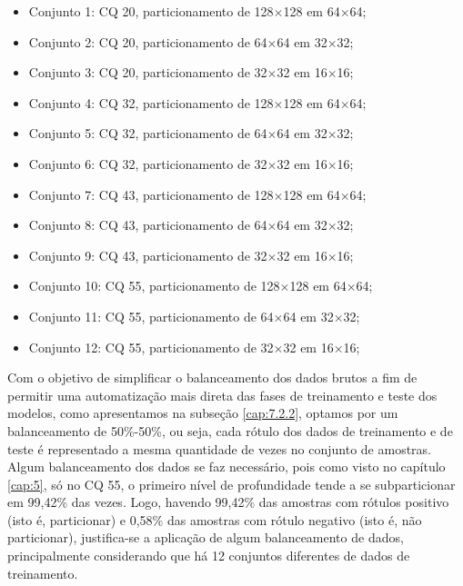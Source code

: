 \begin{itemize}
    \item Conjunto 1: CQ 20, particionamento de 128$\times$128 em 64$\times$64;

    \item Conjunto 2: CQ 20, particionamento de 64$\times$64 em 32$\times$32;

    \item Conjunto 3: CQ 20, particionamento de 32$\times$32 em 16$\times$16;

    \item Conjunto 4: CQ 32, particionamento de 128$\times$128 em 64$\times$64;

    \item Conjunto 5: CQ 32, particionamento de 64$\times$64 em 32$\times$32;

    \item Conjunto 6: CQ 32, particionamento de 32$\times$32 em 16$\times$16;

    \item Conjunto 7: CQ 43, particionamento de 128$\times$128 em 64$\times$64;

    \item Conjunto 8: CQ 43, particionamento de 64$\times$64 em 32$\times$32;

    \item Conjunto 9: CQ 43, particionamento de 32$\times$32 em 16$\times$16;

    \item Conjunto 10: CQ 55, particionamento de 128$\times$128 em 64$\times$64;

    \item Conjunto 11: CQ 55, particionamento de 64$\times$64 em 32$\times$32;

    \item Conjunto 12: CQ 55, particionamento de 32$\times$32 em 16$\times$16;
\end{itemize}

Com o objetivo de simplificar o balanceamento dos dados brutos a fim de permitir uma automatização mais direta das fases de treinamento e teste dos modelos, como apresentamos na subseção \ref{cap:7.2.2}, optamos por um balanceamento de 50\%-50\%, ou seja, cada rótulo dos dados de treinamento e de teste é representado a mesma quantidade de vezes no conjunto de amostras. Algum balanceamento dos dados se faz necessário, pois como visto no capítulo \ref{cap:5}, só no CQ 55, o primeiro nível de profundidade tende a se subparticionar em 99,42\% das vezes. Logo, havendo 99,42\% das amostras com rótulos positivo (isto é, particionar) e 0,58\% das amostras com rótulo negativo (isto é, não particionar), justifica-se a aplicação de algum balanceamento de dados, principalmente considerando que há 12 conjuntos diferentes de dados de treinamento.

